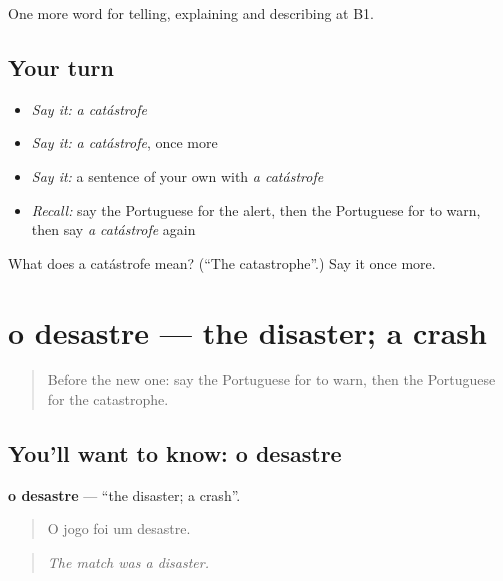 \begin{grammarlens}[title={What you've built}]
One more word for telling, explaining and describing at B1.
\end{grammarlens}

\subsection*{Your turn}
\begin{itemize}
\raggedright
  \item \emph{Say it:} \emph{a catástrofe}
  \item \emph{Say it:} \emph{a catástrofe}, once more
  \item \emph{Say it:} a sentence of your own with \emph{a catástrofe}
  \item \emph{Recall:} say the Portuguese for the alert, then the Portuguese for to warn, then say \emph{a catástrofe} again
\end{itemize}

\begin{tcolorbox}[breakable,colback=teal!4,colframe=teal!35!black,title={Before you move on}]
What does a catástrofe mean? (\textquotedblleft{}The catastrophe\textquotedblright{}.) Say it once more.
\end{tcolorbox}
\section[o desastre]{o desastre — the disaster; a crash}

\label{lesson:PT-C304-desastre}



\begin{quote}
Before the new one: say the Portuguese for to warn, then the Portuguese for the catastrophe.
\end{quote}

\subsection*{You'll want to know: o desastre}
\textbf{o desastre} — \textquotedblleft{}the disaster; a crash\textquotedblright{}.

\begin{quote}
O jogo foi um desastre.
\end{quote}

\begin{quote}
\emph{The match was a disaster.}
\end{quote}

